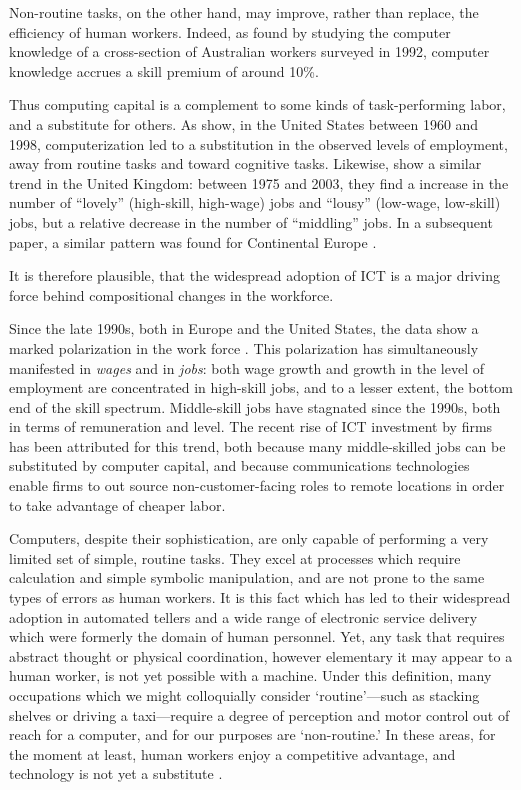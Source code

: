 Non-routine tasks, on the other hand, may improve, rather than replace, the efficiency of human workers. Indeed, as \citet{Borland2004} found by studying the computer knowledge of a cross-section of Australian workers surveyed in 1992, computer knowledge accrues a skill premium of around 10\%.

Thus computing capital is a complement to some kinds of task-performing labor, and a substitute for others. As \citet{Levy2003} show, in the United States between 1960 and 1998, computerization led to a substitution in the observed levels of employment, away from routine tasks and toward cognitive tasks. Likewise, \citet{Goos2007} show a similar trend in the United Kingdom: between 1975 and 2003, they find a increase in the number of ``lovely'' (high-skill, high-wage) jobs and ``lousy'' (low-wage, low-skill) jobs, but a relative decrease in the number of ``middling'' jobs. In a subsequent paper, a similar pattern was found for Continental Europe \citep{Goos2009}.

It is therefore plausible, that the widespread adoption of ICT is a major driving force behind compositional changes in the workforce. 


Since the late 1990s, both in Europe and the United States, the data show a marked polarization in the work force \citep{Goos2007, Autor2006}. This polarization has simultaneously manifested in \emph{wages} and in \emph{jobs}: both wage growth and growth in the level of employment are concentrated in high-skill jobs, and to a lesser extent, the bottom end of the skill spectrum. Middle-skill jobs have stagnated since the 1990s, both in terms of remuneration and level. The recent rise of ICT investment by firms has been attributed for this trend, both because many middle-skilled jobs can be substituted by computer capital, and because communications technologies enable firms to out source non-customer-facing roles to remote locations in order to take advantage of cheaper labor.

Computers, despite their sophistication, are only capable of performing a very limited set of simple, routine tasks. They excel at processes which require calculation and simple symbolic manipulation, and are not prone to the same types of errors as human workers. It is this fact which has led to their widespread adoption in automated tellers and a wide range of electronic service delivery which were formerly the domain of human personnel. Yet, any task that requires abstract thought or physical coordination, however elementary it may appear to a human worker, is not yet possible with a machine. Under this definition, many occupations which we might colloquially consider `routine'---such as stacking shelves or driving a taxi---require a degree of perception and motor control out of reach for a computer, and for our purposes are `non-routine.' In these areas, for the moment at least, human workers enjoy a competitive advantage, and technology is not yet a substitute \citep{Levy2003}.

